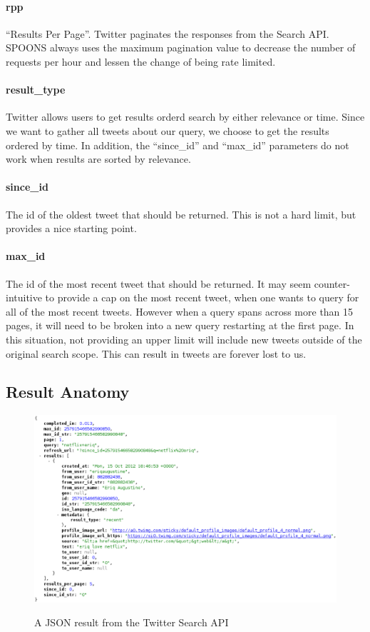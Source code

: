 \documentclass[12pt]{ucthesis}
\newcommand{\captionfonts}{\small\bf\ssp}
\begin{document}
\paragraph{rpp}
``Results Per Page''. Twitter paginates the responses from the Search API. SPOONS always uses the maximum pagination value to decrease the number of requests per hour and lessen the change of being rate limited.

\paragraph{result\_type}
Twitter allows users to get results orderd search by either relevance or time. Since we want to gather all tweets about
our query, we choose to get the results ordered by time. In addition, the ``since\_id'' and ``max\_id''
parameters do not work when results are sorted by relevance.

\paragraph{since\_id}
The id of the oldest tweet that should be returned. This is not a hard limit, but provides a nice starting point.

\paragraph{max\_id}
The id of the most recent tweet that should be returned. It may seem counter-intuitive to provide a cap on the
most recent tweet, when one wants to query for all of the most recent tweets. However when a query spans across
more than 15 pages, it will need to be broken into a new query restarting at the first page. In this situation,
not providing an upper limit will include new tweets outside of the original search scope. This can result in tweets
are forever lost to us.

\subsection{Result Anatomy}
\begin{figure}
   \begin{center}
      \includegraphics[width=140mm]{images/api_result.eps}
      \captionfonts
      \caption[Twitter Search API Result]{A JSON result from the Twitter Search API}
      \label{fig:apiRes}
   \end{center}
\end{figure}
\end{document}
